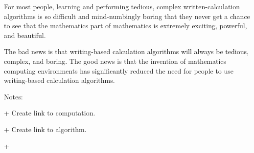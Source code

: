 \documentclass[12pt,oneside]{book}
\begin{document}
For most people, learning and performing tedious, complex written{}-calculation algorithms is so difficult and mind{}-numbingly boring that they never get a chance to see that the {\textquotedbl}mathematics{\textquotedbl} part of mathematics is extremely exciting, powerful, and beautiful. 

The bad news is that writing{}-based calculation algorithms will always be tedious, complex, and boring. The good news is that the invention of mathematics computing environments has significantly reduced the need for people to use writing{}-based calculation algorithms. 


Notes:


+ Create link to {\textquotedbl}computation{\textquotedbl}.

+ Create link to {\textquotedbl}algorithm{\textquotedbl}.

+

\backmatter
\end{document}
